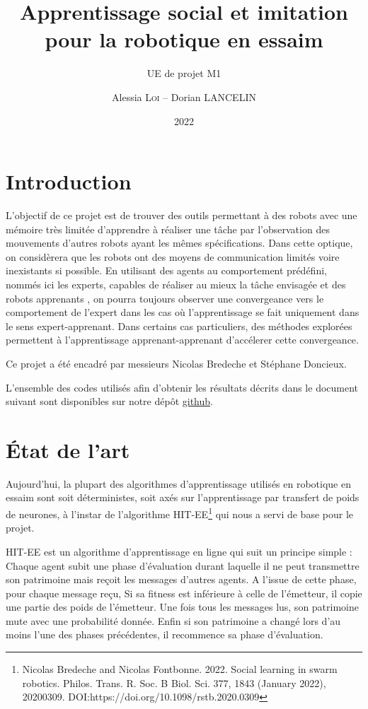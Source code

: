 \documentclass[a4paper, 12pt]{report}
\institute{Sorbonne Université}
\title{Apprentissage social et imitation pour la robotique en essaim}
\subtitle{UE de projet M1}
\author{Alessia \textsc{Loi} -- Dorian \textsc{LANCELIN}}
\date{2022}
\begin{document}
    \maketitle
    \romantableofcontents

    \chapter{Introduction}
	L'objectif de ce projet est de trouver des outils permettant à des robots avec une mémoire très limitée d'apprendre à réaliser une tâche par l'observation des mouvements d'autres robots ayant les mêmes spécifications.
Dans cette optique, on considèrera que les robots ont des moyens de communication limités voire inexistants si possible.
En utilisant des agents au comportement prédéfini, nommés ici les experts, capables de réaliser au mieux la tâche envisagée et des robots apprenants , on pourra toujours observer une convergeance vers le comportement de l'expert dans les cas où l'apprentissage se fait uniquement dans le sens expert-apprenant.
    Dans certains cas particuliers, des méthodes explorées permettent à l'apprentissage apprenant-apprenant d'accélerer cette convergeance. 
    
    Ce projet a été encadré par messieurs Nicolas Bredeche et Stéphane Doncieux.  
    
    L'ensemble des codes utilisés afin d'obtenir les résultats décrits dans le document suivant sont disponibles sur notre dépôt \href{https://github.com/aerrynn/M1_Projet_ASIRE}{github}. 

    \chapter{État de l'art}
    Aujourd'hui, la plupart des algorithmes d'apprentissage utilisés en robotique en essaim sont soit déterministes, soit axés sur l'apprentissage par transfert de poids de neurones, à l'instar de l'algorithme HIT-EE\footnote{Nicolas Bredeche and Nicolas Fontbonne. 2022. Social learning in swarm robotics. Philos. Trans. R. Soc. B Biol. Sci. 377, 1843 (January 2022), 20200309. DOI:https://doi.org/10.1098/rstb.2020.0309} qui nous a servi de base pour le projet.
    
    HIT-EE est un algorithme d'apprentissage en ligne qui suit un principe simple : Chaque agent subit une phase d'évaluation durant laquelle il ne peut transmettre son patrimoine mais reçoit les messages d'autres agents. A l'issue de cette phase, pour chaque message reçu, Si sa fitness est inférieure à celle de l'émetteur, il copie une partie des poids de l'émetteur. Une fois tous les messages lus, son patrimoine mute avec une probabilité donnée. Enfin si son patrimoine a changé lors d'au moins l'une des phases précédentes, il recommence sa phase d'évaluation.
    
\end{document}
